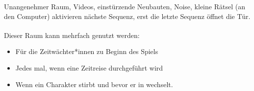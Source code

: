 Unangenehmer Raum, Videos, einstürzende Neubauten, Noise, kleine Rätsel (an den
Computer) aktivieren nächste Sequenz, erst die letzte Sequenz öffnet die
Tür.\\\\
%
Dieser Raum kann mehrfach genutzt werden: 
\begin{itemize}
  \item Für die Zeitwächter*innen zu Beginn des Spiels 
  \item Jedes mal, wenn eine Zeitreise durchgeführt wird 
  \item Wenn ein Charakter stirbt und bevor er in 
    wechselt.
\end{itemize}
